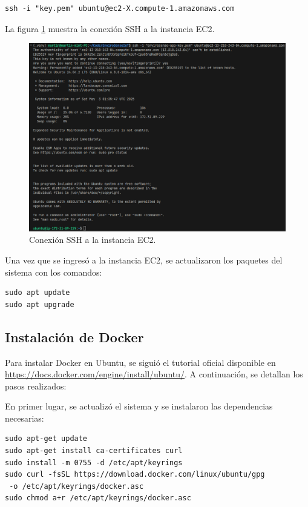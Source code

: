 \begin{verbatim}
ssh -i "key.pem" ubuntu@ec2-X.compute-1.amazonaws.com
\end{verbatim}

La figura \ref{fig:aws-ec2-ssh} muestra la conexión SSH a la instancia EC2.
\begin{figure}[H]
    \centering
    \includegraphics[width=\textwidth]{./Images/33-ec2-2.png}
    \caption{Conexión SSH a la instancia EC2.}
    \label{fig:aws-ec2-ssh}
\end{figure}

Una vez que se ingresó a la instancia EC2, se actualizaron los paquetes del
sistema con los comandos:

\begin{verbatim}
sudo apt update
sudo apt upgrade
\end{verbatim}

\subsection{Instalación de Docker}
Para instalar Docker en Ubuntu, se siguió el tutorial oficial disponible en
\url{https://docs.docker.com/engine/install/ubuntu/}. A continuación, se
detallan los pasos realizados:

En primer lugar, se actualizó el sistema y se instalaron las dependencias
necesarias:

\begin{verbatim}
sudo apt-get update
sudo apt-get install ca-certificates curl
sudo install -m 0755 -d /etc/apt/keyrings
sudo curl -fsSL https://download.docker.com/linux/ubuntu/gpg
 -o /etc/apt/keyrings/docker.asc
sudo chmod a+r /etc/apt/keyrings/docker.asc
\end{verbatim}

